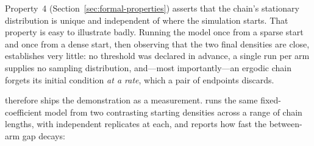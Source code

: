 \documentclass[
  article]{jss}
\begin{document}
Property~4 (Section~\ref{sec:formal-properties}) asserts that the
chain's stationary distribution is unique and independent of where the
simulation starts. That property is easy to illustrate badly. Running
the model once from a sparse start and once from a dense start, then
observing that the two final densities are close, establishes very
little: no threshold was declared in advance, a single run per arm
supplies no sampling distribution, and---most importantly---an ergodic
chain forgets its initial condition \emph{at a rate}, which a pair of
endpoints discards.

 therefore ships the demonstration as a measurement.
 runs the same fixed-coefficient
model from two contrasting starting densities across a range of chain
lengths, with independent replicates at each, and reports how fast the
between-arm gap decays:
\end{document}
